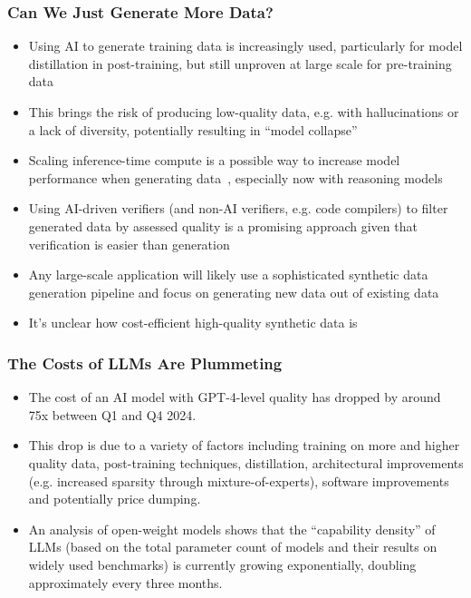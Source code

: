 \documentclass[aspectratio=169]{beamer}
\begin{document}
    \begin{frame}
        \frametitle{Can We Just Generate More Data?}
        \begin{itemize}
            \item Using AI to generate training data is increasingly used, particularly for model distillation in post-training, but still unproven at large scale for pre-training data
            \item This brings the risk of producing low-quality data, e.g. with hallucinations or a lack of diversity, potentially resulting in ``model collapse''~\parencite{shumailov2024curserecursiontraininggenerated}
            \item Scaling inference-time compute is a possible way to increase model performance when generating data~\parencite{epoch2023tradingoffcomputeintrainingandinference}, especially now with reasoning models
            \item Using AI-driven verifiers (and non-AI verifiers, e.g. code compilers) to filter generated data by assessed quality is a promising approach given that verification is easier than generation~\parencite{feng2024modelcollapsescalingsynthesized}
            \item Any large-scale application will likely use a sophisticated synthetic data generation pipeline and focus on generating new data out of existing data~\parencite{hao2025magamassivegenreaudiencereformulation}
            \item It's unclear how cost-efficient high-quality synthetic data is
        \end{itemize}
    \end{frame}
    \begin{frame}
        \frametitle{The Costs of LLMs Are Plummeting}
        \begin{itemize}
            \item The cost of an AI model with GPT-4-level quality has dropped by around 75x between Q1 and Q4 2024.~\parencite{artificial_analysis_2024}
            \item This drop is due to a variety of factors including training on more and higher quality data, post-training techniques, distillation, architectural improvements (e.g. increased sparsity through mixture-of-experts), software improvements and potentially price dumping.
            \item An analysis of open-weight models shows that the ``capability density'' of LLMs (based on the total parameter count of models and their results on widely used benchmarks) is currently growing exponentially, doubling approximately every three months.~\parencite{xiao2024densinglawllms}
        \end{itemize}
    \end{frame}
\end{document}
